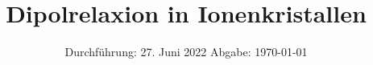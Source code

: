 

\subject{V48}
\title{Dipolrelaxion in Ionenkristallen}
\date{%
  Durchführung: 27. Juni 2022
  \hspace{3em}
  Abgabe: \today
}



\maketitle
\thispagestyle{empty}
\tableofcontents
\newpage








\nocite{matplotlib}
\nocite{numpy}
\nocite{scipy}
\nocite{uncertainties}
\printbibliography{}


